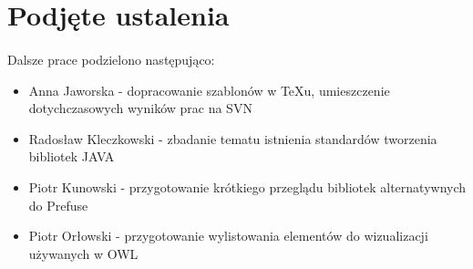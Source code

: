 \documentclass[a4paper,10pt]{article}
\begin{document}
\section{Podjęte ustalenia}
\paragraph{} Dalsze prace podzielono następująco:
	\begin{itemize}
 		\item Anna Jaworska - dopracowanie szablonów w TeXu, umieszczenie dotychczasowych wyników prac na SVN
		\item Radosław Kleczkowski  - zbadanie tematu istnienia standardów tworzenia bibliotek JAVA 
 		\item Piotr Kunowski - przygotowanie krótkiego przeglądu bibliotek alternatywnych do Prefuse
		\item Piotr Orłowski  - przygotowanie wylistowania elementów do wizualizacji używanych w OWL 
	\end{itemize}




%
\end{document}
